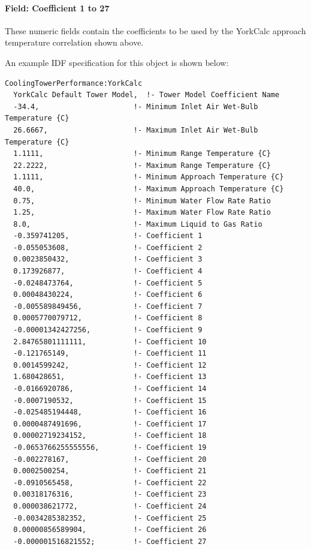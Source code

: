 \paragraph{Field: Coefficient 1 to 27}\label{field-coefficient-1-to-27}

These numeric fields contain the coefficients to be used by the YorkCalc approach temperature correlation shown above.

An example IDF specification for this object is shown below:

\begin{lstlisting}
CoolingTowerPerformance:YorkCalc
  YorkCalc Default Tower Model,  !- Tower Model Coefficient Name
  -34.4,                      !- Minimum Inlet Air Wet-Bulb Temperature {C}
  26.6667,                    !- Maximum Inlet Air Wet-Bulb Temperature {C}
  1.1111,                     !- Minimum Range Temperature {C}
  22.2222,                    !- Maximum Range Temperature {C}
  1.1111,                     !- Minimum Approach Temperature {C}
  40.0,                       !- Maximum Approach Temperature {C}
  0.75,                       !- Minimum Water Flow Rate Ratio
  1.25,                       !- Maximum Water Flow Rate Ratio
  8.0,                        !- Maximum Liquid to Gas Ratio
  -0.359741205,               !- Coefficient 1
  -0.055053608,               !- Coefficient 2
  0.0023850432,               !- Coefficient 3
  0.173926877,                !- Coefficient 4
  -0.0248473764,              !- Coefficient 5
  0.00048430224,              !- Coefficient 6
  -0.005589849456,            !- Coefficient 7
  0.0005770079712,            !- Coefficient 8
  -0.00001342427256,          !- Coefficient 9
  2.84765801111111,           !- Coefficient 10
  -0.121765149,               !- Coefficient 11
  0.0014599242,               !- Coefficient 12
  1.680428651,                !- Coefficient 13
  -0.0166920786,              !- Coefficient 14
  -0.0007190532,              !- Coefficient 15
  -0.025485194448,            !- Coefficient 16
  0.0000487491696,            !- Coefficient 17
  0.00002719234152,           !- Coefficient 18
  -0.0653766255555556,        !- Coefficient 19
  -0.002278167,               !- Coefficient 20
  0.0002500254,               !- Coefficient 21
  -0.0910565458,              !- Coefficient 22
  0.00318176316,              !- Coefficient 23
  0.000038621772,             !- Coefficient 24
  -0.0034285382352,           !- Coefficient 25
  0.00000856589904,           !- Coefficient 26
  -0.000001516821552;         !- Coefficient 27
\end{lstlisting}

